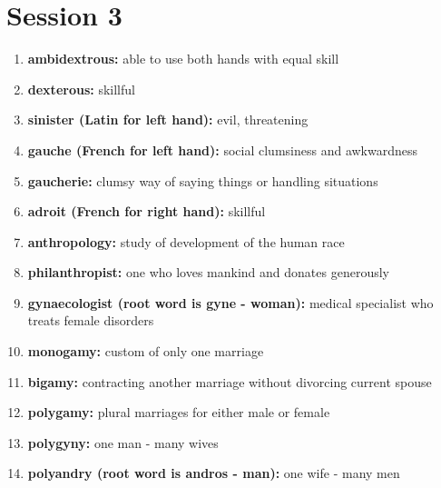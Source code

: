 \documentclass{article}
\begin{document}
\section{Session 3}
\begin{enumerate}
    \item \textbf{ambidextrous: }{able to use both hands with equal skill}
    \item \textbf{dexterous: }{skillful}
    \item \textbf{sinister (Latin for left hand): }{evil, threatening}
    \item \textbf{gauche (French for left hand): }{social clumsiness and awkwardness}
    \item \textbf{gaucherie: }{clumsy way of saying things or handling situations}
    \item \textbf{adroit (French for right hand): }{skillful}
    \item \textbf{anthropology: }{study of development of the human race}
    \item \textbf{philanthropist: }{one who loves mankind and donates generously}
    \item \textbf{gynaecologist (root word is gyne - woman): }{medical specialist who treats female disorders}
    \item \textbf{monogamy: }{custom of only one marriage}
    \item \textbf{bigamy: }{contracting another marriage without divorcing current spouse}
    \item \textbf{polygamy: }{plural marriages for either male or female}
    \item \textbf{polygyny: }{one man - many wives}
    \item \textbf{polyandry (root word is andros - man): }{one wife - many men}
    
\end{enumerate}
\end{document}
